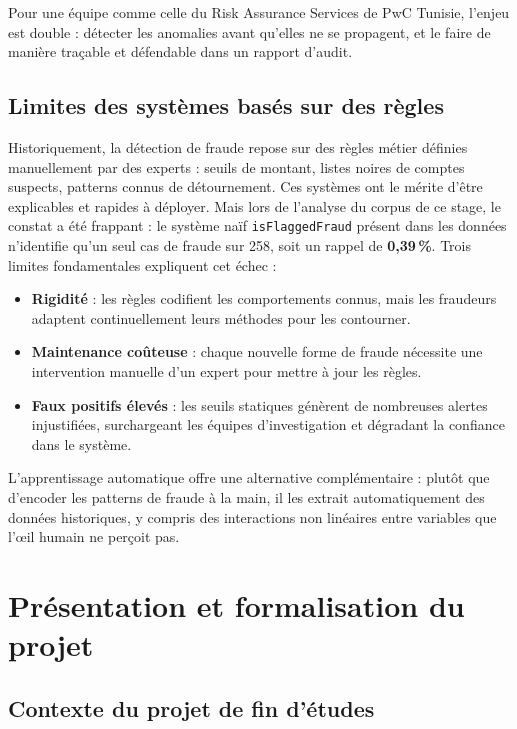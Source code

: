 Pour une équipe comme celle du Risk Assurance Services de PwC Tunisie, l'enjeu est double :
détecter les anomalies avant qu'elles ne se propagent, et le faire de manière traçable et
défendable dans un rapport d'audit.

\subsection{Limites des systèmes basés sur des règles}

Historiquement, la détection de fraude repose sur des règles métier définies manuellement
par des experts : seuils de montant, listes noires de comptes suspects, patterns connus de
détournement. Ces systèmes ont le mérite d'être explicables et rapides à déployer. Mais
lors de l'analyse du corpus de ce stage, le constat a été frappant : le système naïf
\texttt{isFlaggedFraud} présent dans les données n'identifie qu'un seul cas de fraude sur
258, soit un rappel de \textbf{0,39\,\%}. Trois limites fondamentales expliquent cet
échec :

\begin{itemize}
  \item \textbf{Rigidité} : les règles codifient les comportements connus, mais les
    fraudeurs adaptent continuellement leurs méthodes pour les contourner.
  \item \textbf{Maintenance coûteuse} : chaque nouvelle forme de fraude nécessite une
    intervention manuelle d'un expert pour mettre à jour les règles.
  \item \textbf{Faux positifs élevés} : les seuils statiques génèrent de nombreuses
    alertes injustifiées, surchargeant les équipes d'investigation et dégradant la
    confiance dans le système.
\end{itemize}

L'apprentissage automatique offre une alternative complémentaire : plutôt que d'encoder les
patterns de fraude à la main, il les extrait automatiquement des données historiques, y
compris des interactions non linéaires entre variables que l'œil humain ne perçoit pas.

\section{Présentation et formalisation du projet}

\subsection{Contexte du projet de fin d'études}


